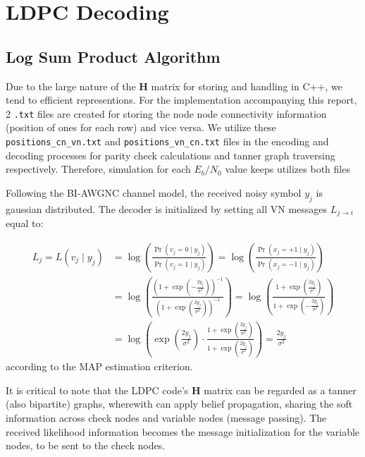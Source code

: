 \documentclass[12pt]{scrreprt}
\begin{document}
	\chapter{LDPC Decoding}
	\section{Log Sum Product Algorithm}
	
	Due to the large nature of the ${\mathbf H}$ matrix for storing and handling in C++, we tend to efficient representions. For the implementation accompanying this report, 2 \verb|.txt| files are created for storing the node node connectivity information (position of ones for each row) and vice versa. We utilize these \verb|positions_cn_vn.txt| and \verb|positions_vn_cn.txt| files in the encoding and decoding processes for parity check calculations and tanner graph traversing respectively. Therefore, simulation for each $E_b/N_0$ value keeps utilizes both files 
	
	Following the BI-AWGNC channel model, the received noisy symbol $y_j$ is gaussian distributed. The decoder is initialized by setting all VN messages $L_{j\to i}$ equal to:
	
	\begin{align*} L_j = L(v_j \mid y_j) &= \log \left( \frac{\Pr(v_j = 0 \mid y_j)}{\Pr(v_j = 1 \mid y_j)} \right) = \log \left( \frac{\Pr(x_j = +1 \mid y_j)}{\Pr(x_j = -1 \mid y_j)} \right) \\ 
		& = \log \left( \frac{\left(1 + \exp\left(-\frac{2 y_j }{\sigma^2}\right)\right)^{-1}}{\left(1 + \exp\left(\frac{2 y_j }{\sigma^2}\right)\right)^{-1}} \right)
		= \log \left( \frac{1 + \exp\left(\frac{2 y_j }{\sigma^2}\right)}{1 + \exp\left(-\frac{2 y_j }{\sigma^2}\right)} \right) \\
		&= \log \left( \exp\left(\frac{2 y_j }{\sigma^2}\right)  \cdot \frac{1 + \exp\left(\frac{2 y_j }{\sigma^2}\right)}{1 + \exp\left(\frac{2 y_j }{\sigma^2} \right)} \right) = \frac{2 y_j }{\sigma^2}
	 \end{align*}
	according to the MAP estimation criterion.
	
	It is critical to note that the LDPC code's $\mathbf{H}$ matrix can be regarded as a tanner (also bipartite) graphs, wherewith can apply belief propagation, sharing the soft information across check nodes and variable nodes (message passing). The received likelihood information becomes the message initialization for the variable nodes, to be sent to the check nodes.
	
\end{document}
